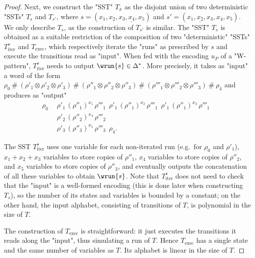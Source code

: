 \documentclass{theoretics}
\begin{document}
\begin{proof}
    Next, we construct the "SST" $T_{\overline x}$ 
    as the disjoint union of two
    deterministic "SSTs" $T_s$ and $T_{s'}$, 
    where $s = (x_1,x_2,x_3,\underline{x_4},x_5)$ and 
    $s' = (x_1,\underline{x_2},x_3,x_4,x_5)$. 
    We only describe $T_s$, as the construction of 
    $T_{s'}$ is similar. 
    The "SST" $T_s$ is obtained as a suitable restriction of 
    the composition of two "deterministic" "SSTs" 
    $T_{\mathrm{iter}}^s$ and $T_{\mathrm{exec}}$, 
    which respectively iterate the "runs" as 
    prescribed by $s$ and execute the 
    transitions read as "input". 
    When fed with the encoding $u_P$ of a "W-pattern", 
    $T_{\mathrm{iter}}^s$ needs to output $\wrun{s}\in\Delta^*$.
    More precisely, it takes as "input" a word of the form 
	$
	  \rho_0 \:\#\: 
	  (\rho'_1 \otimes \rho'_2 \otimes \rho'_3) \:\#\:
	  (\rho''_1 \otimes \rho''_2 \otimes \rho''_3) \:\#\:
	  (\rho'''_1 \otimes \rho'''_2 \otimes \rho'''_3) \:\#\:
	  \rho_4
    $
    and produces as "output"
    \[
    \begin{aligned}
      \rho_0 ~~
      & \rho'_1 \, (\rho''_1)^{x_1} \, \rho'''_1 ~~ 
        \rho'_1 \, (\rho''_1)^{x_2} \, \rho'''_1 ~~ 
        \rho'_1 \, (\rho''_1)^{x_3} \, \rho'''_1 ~~ \\
      & \rho'_2 \, (\rho''_2)^{x_4} \, \rho'''_2 ~~ \\
      & \rho'_3 \, (\rho''_3)^{x_5} \, \rho'''_3 ~~ \rho_4.
	\end{aligned}
    \]

    The SST $T_{\mathrm{iter}}^s$ uses one variable for each
    non-iterated run (e.g.~for $\rho_0$ and $\rho'_1$),
    $x_1+x_2+x_3$ variables to
    store copies of $\rho''_1$, $x_4$ variables to store copies of
    $\rho''_2$, and $x_5$ variables to store copies of $\rho''_3$, and
    eventually outputs the concatenation of all these variables to obtain
    $\wrun{s}$. Note that $T_{\mathrm{iter}}^s$ does not 
	need to check that the "input" is a well-formed encoding (this is done later when constructing $T_s$), 
	so the number of its states and variables is bounded
	by a constant;
	on the other hand, the input alphabet, consisting
	of transitions of $T$, is polynomial in the size of $T$.
        
    The construction of $T_{\mathrm{exec}}$ is straightforward:
    it just executes the transitions it reads along the "input", 
    thus simulating a run of $T$. 
    Hence $T_{\mathrm{exec}}$ has a single state and the same 
    number of variables as $T$. Its alphabet is linear in 
    the size of $T$. 
	

\end{proof}
\end{document}
